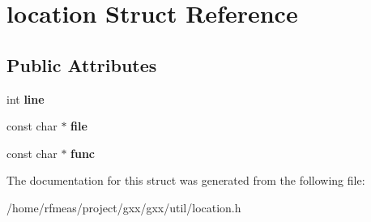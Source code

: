 \hypertarget{structlocation}{}\section{location Struct Reference}
\label{structlocation}
\subsection*{Public Attributes}
\begin{DoxyCompactItemize}
\item 
int {\bfseries line}\hypertarget{structlocation_a4a64db59b07d33b8b5a6b6fea649a322}{}\label{structlocation_a4a64db59b07d33b8b5a6b6fea649a322}

\item 
const char $\ast$ {\bfseries file}\hypertarget{structlocation_a92fcbc870cf6ebbec0da5dc076e055b9}{}\label{structlocation_a92fcbc870cf6ebbec0da5dc076e055b9}

\item 
const char $\ast$ {\bfseries func}\hypertarget{structlocation_a4b46f996654a1c7044f968b2f6d6820a}{}\label{structlocation_a4b46f996654a1c7044f968b2f6d6820a}

\end{DoxyCompactItemize}


The documentation for this struct was generated from the following file\+:\begin{DoxyCompactItemize}
\item 
/home/rfmeas/project/gxx/gxx/util/location.\+h\end{DoxyCompactItemize}
